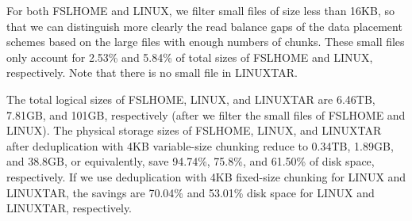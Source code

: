 For both FSLHOME and LINUX, we filter small files of size less than
16KB, so that we can distinguish more clearly the read balance gaps of
the data placement schemes based on the large files with enough numbers of
chunks.  These small files only account for 2.53\% and 5.84\% of total sizes
of FSLHOME and LINUX, respectively.  Note that there is no small
file in LINUXTAR.

The total logical sizes of FSLHOME, LINUX, and LINUXTAR are 6.46TB, 7.81GB,
and 101GB, respectively (after we filter the small files of FSLHOME and
LINUX).  The physical storage sizes of FSLHOME, LINUX, and LINUXTAR after
deduplication with 4KB variable-size chunking reduce to 0.34TB, 1.89GB, and
38.8GB, or equivalently, save 94.74\%, 75.8\%, and 61.50\% of disk space,
respectively.  If we use deduplication with 4KB fixed-size chunking for LINUX
and LINUXTAR, the savings are 70.04\% and 53.01\% disk space for LINUX and
LINUXTAR, respectively.


